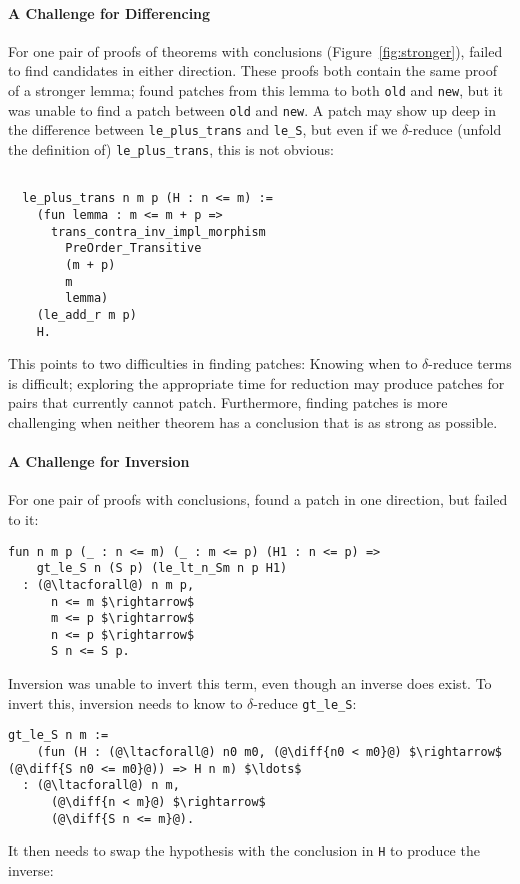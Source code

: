 \paragraph{A Challenge for Differencing} For one pair of proofs of theorems 
with  conclusions (Figure~\ref{fig:stronger}),
 failed to find candidates in either direction.
These proofs both contain the same proof of a stronger lemma;
\sysname found patches from this lemma to
both \lstinline{old} and \lstinline{new},
but it was unable to find a patch between \lstinline{old} and \lstinline{new}.
A patch may show up deep in the difference between \lstinline{le_plus_trans}
and \lstinline{le_S}, but even if we $\delta$-reduce (unfold the definition of) \lstinline{le_plus_trans}, this is not obvious:

\begin{lstlisting}

  le_plus_trans n m p (H : n <= m) :=
    (fun lemma : m <= m + p =>
      trans_contra_inv_impl_morphism
        PreOrder_Transitive
        (m + p)
        m
        lemma)
    (le_add_r m p)
    H.
\end{lstlisting}
This points to two difficulties in finding patches: Knowing when to $\delta$-reduce terms 
is difficult; exploring the appropriate time for reduction
may produce patches for pairs that \sysname currently cannot patch.
Furthermore, finding patches is more challenging
when neither theorem has a conclusion that is as strong as possible.

\paragraph{A Challenge for Inversion} For one pair of proofs with  conclusions,
\sysname found a patch in one direction, but failed to  it:

\begin{lstlisting}[language=coq]
  fun n m p (_ : n <= m) (_ : m <= p) (H1 : n <= p) =>
    gt_le_S n (S p) (le_lt_n_Sm n p H1)
  : (@\ltacforall@) n m p,
      n <= m $\rightarrow$
      m <= p $\rightarrow$
      n <= p $\rightarrow$
      S n <= S p.
\end{lstlisting}
Inversion was unable to invert this term, even though an inverse does exist.
To invert this, inversion needs to know to $\delta$-reduce \lstinline{gt_le_S}:

\begin{lstlisting}[language=coq]
  gt_le_S n m :=
    (fun (H : (@\ltacforall@) n0 m0, (@\diff{n0 < m0}@) $\rightarrow$ (@\diff{S n0 <= m0}@)) => H n m) $\ldots$
  : (@\ltacforall@) n m,
      (@\diff{n < m}@) $\rightarrow$
      (@\diff{S n <= m}@).
\end{lstlisting}
It then needs to swap the hypothesis with the conclusion in \lstinline{H} to produce the inverse:

